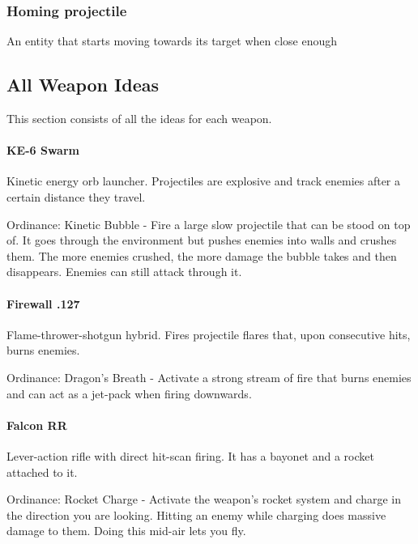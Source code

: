 \documentclass[../Main.tex]{subfiles}
\begin{document}
\subsubsection{Homing projectile}

An entity that starts moving towards its target when close enough


\subsection{All Weapon Ideas}

This section consists of all the ideas for each weapon.

\paragraph{KE-6 Swarm}

Kinetic energy orb launcher. Projectiles are explosive and track enemies after a certain distance they travel. 

Ordinance: Kinetic Bubble - Fire a large slow projectile that can be stood on top of. It goes through the environment but pushes enemies into walls and crushes them. The more enemies crushed, the more damage the bubble takes and then disappears. Enemies can still attack through it.

\paragraph{Firewall .127}

Flame-thrower-shotgun hybrid. Fires projectile flares that, upon consecutive hits, burns enemies.

Ordinance: Dragon's Breath - Activate a strong stream of fire that burns enemies and can act as a jet-pack when firing downwards.

\paragraph{Falcon RR}

Lever-action rifle with direct hit-scan firing. It has a bayonet and a rocket attached to it.

Ordinance: Rocket Charge - Activate the weapon's rocket system and charge in the direction you are looking. Hitting an enemy while charging does massive damage to them. Doing this mid-air lets you fly.
\end{document}
